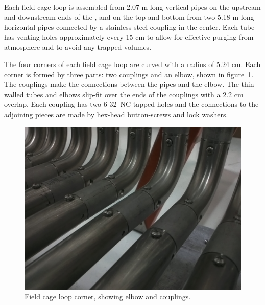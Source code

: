 Each field cage loop is assembled from 2.07 m long vertical pipes on the upstream and downstream ends of the \lartpc, and on the top and bottom from two 5.18 m long horizontal pipes connected by a stainless steel coupling in the center.  Each tube has venting holes approximately every 15 cm to allow for effective purging from atmosphere and to avoid any trapped volumes.  

The four corners of each field cage loop are curved with a radius of 5.24 cm. Each corner is formed by three parts: two couplings and an elbow, shown in figure~\ref{fig:tpc-fieldcage-elbows}. The couplings make the connections between the pipes and the elbow. The thin-walled tubes and elbows slip-fit over the ends of the couplings with a 2.2 cm overlap. Each coupling has two 6-32~NC tapped holes and the connections to the adjoining pieces are made by hex-head button-screws and lock washers.

\begin{figure}
\centering	
\includegraphics[width=0.9\linewidth]{figures/tpc-fieldcage-coupling.jpg}
\caption{Field cage loop corner, showing elbow and couplings.}
\label{fig:tpc-fieldcage-elbows}
\end{figure}

